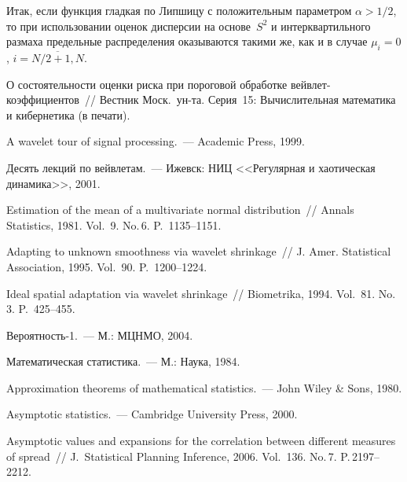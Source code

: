 \begin{multicols}{2}
Итак, если функция гладкая по Липшицу с положительным параметром  $\alpha>1/2$, 
то при использовании оценок дисперсии на основе~$S^2$ и интерквартильного размаха 
предельные распределения оказываются такими же, как и в случае $\mu_i=0$, $i=\overline{N/2+1,N}$.


{\small\frenchspacing
{%
\begin{thebibliography}{99}    

О состоятельности оценки риска при пороговой обработке вейвлет-коэффициентов~// 
Вестник Моск.\ ун-та. Серия~15: Вычислительная математика и кибернетика (в пе\-чати).


A wavelet tour of signal processing.~--- Academic Press, 1999.

Десять лекций по вейвлетам.~--- Ижевск: НИЦ <<Регулярная и хаотическая динамика>>, 2001.

Estimation of the mean of a multivariate normal distribution~// Annals Statistics, 1981. Vol.~9. No.\,6. P.~1135--1151.

 Adapting to unknown smoothness via wavelet shrinkage~// J. Amer. Statistical Association, 1995. 
 Vol.~90. P.~1200--1224.

Ideal spatial adaptation via wavelet shrinkage~// Biometrika, 1994. Vol.~81. No.\,3. P.~425--455.


 Вероятность-1.~--- М.: МЦНМО, 2004.

 Математическая статистика.~--- М.: Наука, 1984.

Approximation theorems of mathematical statistics.~--- John Wiley \& Sons, 1980.

Asymptotic statistics.~--- Cambridge University Press, 2000.

\label{end\stat}

Asymptotic values and expansions for the correlation between different measures of spread~// 
J.\ Statistical Planning Inference, 2006. Vol.~136. No.\,7. P.\,2197--2212.
 \end{thebibliography}
}
}
\end{multicols}